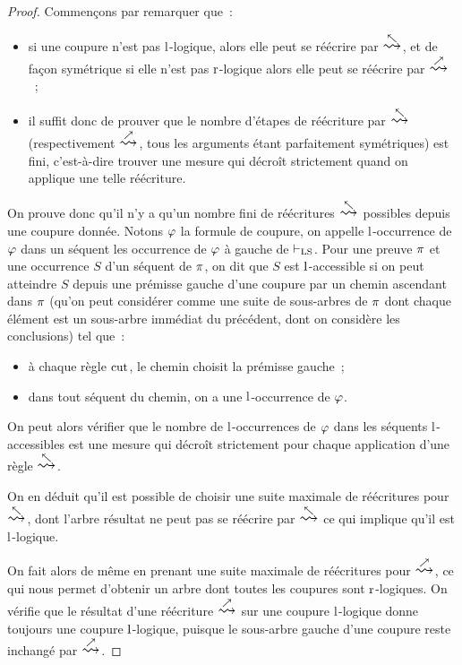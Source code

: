 \begin{proof}
  Commençons par remarquer que~:
  \begin{itemize}
  \item si une coupure n'est pas $\operatorname{l}$-logique, alors elle peut se réécrire par
    $\reecr{\nwarrow}$, et de façon symétrique si elle n'est pas $\operatorname{r}$-logique
    alors elle peut se réécrire par $\reecr{\nearrow}$~;
  \item il suffit donc de prouver que le nombre d'étapes de réécriture par
    $\reecr{\nwarrow}$ (respectivement $\reecr{\nearrow}$, tous les arguments
    étant parfaitement symétriques) est fini, c'est-à-dire trouver une mesure
    qui décroît strictement quand on applique une telle réécriture.
  \end{itemize}

  On prouve donc qu'il n'y a qu'un nombre fini de réécritures
  $\reecr{\nwarrow}$ possibles depuis une coupure donnée. Notons $\varphi$
  la formule de coupure, on appelle $\operatorname{l}$-occurrence de $\varphi$ dans un
  séquent les occurrence de $\varphi$ à gauche de $\vdash_{\operatorname{LS}}$. Pour une preuve
  $\pi$ et une occurrence $S$ d'un séquent de $\pi$, on dit que $S$ est
  $\operatorname{l}$-accessible si on peut atteindre $S$ depuis une prémisse gauche d'une
  coupure par un chemin ascendant dans $\pi$ (qu'on peut considérer comme
  une suite de sous-arbres de $\pi$ dont chaque élément est un sous-arbre
  immédiat du précédent, dont on considère les conclusions) tel que~:
  \begin{itemize}
  \item à chaque règle $\operatorname{cut}$, le chemin choisit la prémisse gauche~;
  \item dans tout séquent du chemin, on a une $\operatorname{l}$-occurrence de $\varphi$.
  \end{itemize}
  On peut alors vérifier que le nombre de $\operatorname{l}$-occurrences de $\varphi$ dans
  les séquents $\operatorname{l}$-accessibles est une mesure qui décroît strictement pour
  chaque application d'une règle $\reecr{\nwarrow}$.

  On en déduit qu'il est possible de choisir une suite maximale de réécritures
  pour $\reecr{\nwarrow}$, dont l'arbre résultat ne peut pas se réécrire par
  $\reecr{\nwarrow}$ ce qui implique qu'il est $\operatorname{l}$-logique.

  On fait alors de même en prenant une suite maximale de réécritures pour
  $\reecr{\nearrow}$, ce qui nous permet d'obtenir un arbre dont toutes les
  coupures sont $\operatorname{r}$-logiques. On vérifie que le résultat d'une
  réécriture $\reecr{\nearrow}$ sur une coupure $\operatorname{l}$-logique donne toujours
  une coupure $\operatorname{l}$-logique, puisque le sous-arbre gauche d'une coupure reste
  inchangé par $\reecr{\nearrow}$.
\end{proof}

